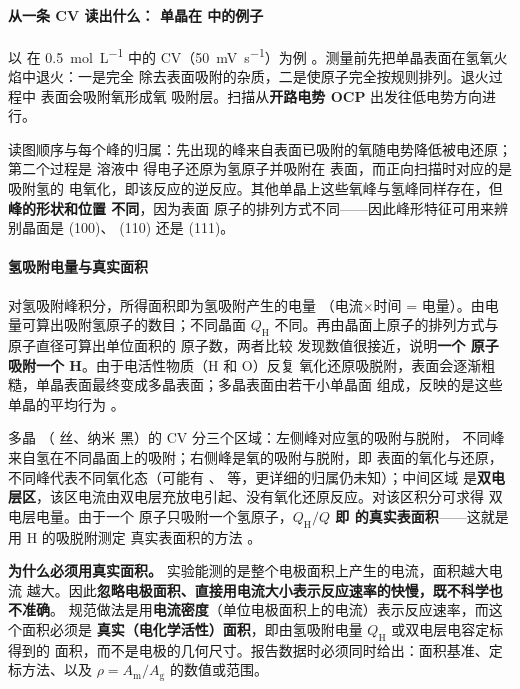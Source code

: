 \paragraph{从一条 CV 读出什么： 单晶在  中的例子} 以  在
\qty{0.5}{mol.L^{-1}}  中的 CV（\qty{50}{mV.s^{-1}}）为例
。测量前先把单晶表面在氢氧火焰中退火：一是完全
除去表面吸附的杂质，二是使原子完全按规则排列。退火过程中  表面会吸附氧形成氧
吸附层。扫描从\textbf{开路电势 OCP} 出发往低电势方向进行。

读图顺序与每个峰的归属：先出现的峰来自表面已吸附的氧随电势降低被电还原；第二个过程是
溶液中  得电子还原为氢原子并吸附在  表面，而正向扫描时对应的是吸附氢的
电氧化，即该反应的逆反应。其他单晶上这些氧峰与氢峰同样存在，但\textbf{峰的形状和位置
不同}，因为表面  原子的排列方式不同——因此峰形特征可用来辨别晶面是 (100)、
(110) 还是 (111)。

\paragraph{氢吸附电量与真实面积} 对氢吸附峰积分，所得面积即为氢吸附产生的电量
（电流$\times$时间 = 电量）。由电量可算出吸附氢原子的数目；不同晶面 $Q_{\mathrm{H}}$
不同。再由晶面上原子的排列方式与原子直径可算出单位面积的  原子数，两者比较
发现数值很接近，说明\textbf{一个  原子吸附一个 H}。由于电活性物质（H 和 O）反复
氧化还原吸脱附，表面会逐渐粗糙，单晶表面最终变成多晶表面；多晶表面由若干小单晶面
组成，反映的是这些单晶的平均行为 。

多晶 （ 丝、纳米  黑）的 CV 分三个区域：左侧峰对应氢的吸附与脱附，
不同峰来自氢在不同晶面上的吸附；右侧峰是氧的吸附与脱附，即  表面的氧化与还原，
不同峰代表不同氧化态（可能有 、 等，更详细的归属仍未知）；中间区域
是\textbf{双电层区}，该区电流由双电层充放电引起、没有氧化还原反应。对该区积分可求得
双电层电量。由于一个  原子只吸附一个氢原子，\textbf{$Q_{\mathrm{H}}/Q$ 即 
的真实表面积}——这就是用 H 的吸脱附测定  真实表面积的方法
。

\begin{dataflow}
\textbf{为什么必须用真实面积。} 实验能测的是整个电极面积上产生的电流，面积越大电流
越大。因此\textbf{忽略电极面积、直接用电流大小表示反应速率的快慢，既不科学也不准确}。
规范做法是用\textbf{电流密度}（单位电极面积上的电流）表示反应速率，而这个面积必须是
\textbf{真实（电化学活性）面积}，即由氢吸附电量 $Q_{\mathrm{H}}$ 或双电层电容定标得到的
面积，而不是电极的几何尺寸。报告数据时必须同时给出：面积基准、定标方法、以及
$\rho=A_{\mathrm{m}}/A_{\mathrm{g}}$ 的数值或范围。
\end{dataflow}

